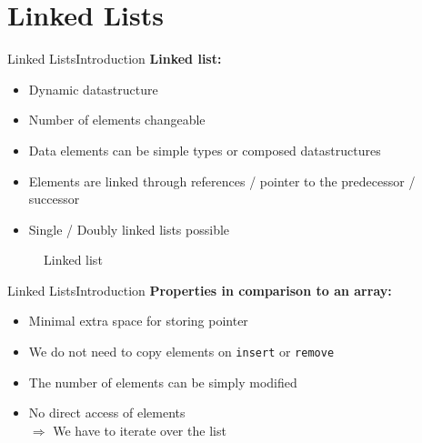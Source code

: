 \section{Linked Lists}

\begin{frame}{Linked Lists}{Introduction}
  \textbf{Linked list:}
  \begin{itemize}
    \item<2->
      Dynamic datastructure
    \item<3->
      Number of elements changeable
    \item<4->
      Data elements can be simple types or composed datastructures
    \item<5->
      Elements are linked through references / pointer to the predecessor /
      successor
    \item<6->
      Single / Doubly linked lists possible
  \end{itemize}
  \begin{figure}
    
    \caption{Linked list}
    \label{fig:linked_list:singly_linked_list}
  \end{figure}
\end{frame}


\begin{frame}{Linked Lists}{Introduction}
  \textbf{Properties in comparison to an array:}
  \begin{itemize}
    \item<2->
      Minimal extra space for storing pointer
    \item<3->
      We do not need to copy elements on {\color{Mittel-Blau}\texttt{insert}}
      or {\color{Mittel-Blau}\texttt{remove}}
    \item<4->
      The number of elements can be simply modified 
    \item<5->
      No direct access of elements\\
      $\Rightarrow$ We have to iterate over the list
  \end{itemize}
\end{frame}


